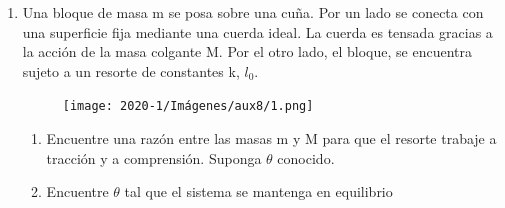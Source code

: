 \documentclass[letterpaper,11pt]{article}
\begin{document}
\begin{enumerate}
\item Una bloque de masa m se posa sobre una cuña. Por un lado se conecta con una superficie fija mediante una cuerda ideal. La cuerda es tensada gracias a la acción de la masa colgante M. Por el otro lado, el bloque, se encuentra sujeto a un resorte de constantes k, $l_0$.\\
\begin{figure}[h!]
    \centering
    \texttt{[image: 2020-1/Imágenes/aux8/1.png]}
\end{figure}

\begin{enumerate}
    \item Encuentre una razón entre las masas m y M para que el resorte trabaje a tracción y a comprensión. Suponga $\theta$ conocido.
    \item Encuentre $\theta$ tal que el sistema se mantenga en equilibrio
\end{enumerate}

\end{enumerate}
\end{document}
